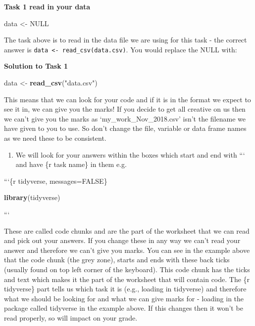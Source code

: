 \documentclass[]{book}
\newenvironment{Shaded}{\begin{snugshade}}{\end{snugshade}}
\newcommand{\KeywordTok}[1]{\textcolor[rgb]{0.13,0.29,0.53}{\textbf{#1}}}
\newcommand{\NormalTok}[1]{#1}
\newcommand{\OtherTok}[1]{\textcolor[rgb]{0.56,0.35,0.01}{#1}}
\newcommand{\StringTok}[1]{\textcolor[rgb]{0.31,0.60,0.02}{#1}}
\providecommand{\tightlist}{%
  \setlength{\itemsep}{0pt}\setlength{\parskip}{0pt}}
\begin{document}
\textbf{Task 1 read in your data}

\begin{Shaded}
\begin{Highlighting}[]
\NormalTok{data <-}\StringTok{ }\OtherTok{NULL}
\end{Highlighting}
\end{Shaded}

The task above is to read in the data file we are using for this task - the correct answer is \texttt{data\ \textless{}-\ read\_csv(data.csv)}. You would replace the NULL with:

\textbf{Solution to Task 1}

\begin{Shaded}
\begin{Highlighting}[]
\NormalTok{data <-}\StringTok{ }\KeywordTok{read_csv}\NormalTok{(}\StringTok{"data.csv"}\NormalTok{)}
\end{Highlighting}
\end{Shaded}

This means that we can look for your code and if it is in the format we expect to see it in, we can give you the marks! If you decide to get all creative on us then we can't give you the marks as `my\_work\_Nov\_2018.csv' isn't the filename we have given to you to use. So don't change the file, variable or data frame names as we need these to be consistent.

\begin{enumerate}
\def\labelenumi{\arabic{enumi}.}
\setcounter{enumi}{1}
\tightlist
\item
  We will look for your answers within the boxes which start and end with ``` and have \{r task name\} in them e.g.
\end{enumerate}

```\{r tidyverse, messages=FALSE\}

\begin{Shaded}
\begin{Highlighting}[]
\KeywordTok{library}\NormalTok{(tidyverse)}
\end{Highlighting}
\end{Shaded}

```

These are called code chunks and are the part of the worksheet that we can read and pick out your answers. If you change these in any way we can't read your answer and therefore we can't give you marks. You can see in the example above that the code chunk (the grey zone), starts and ends with these back ticks (usually found on top left corner of the keyboard). This code chunk has the ticks and text which makes it the part of the worksheet that will contain code. The \{r tidyverse\} part tells us which task it is (e.g., loading in tidyverse) and therefore what we should be looking for and what we can give marks for - loading in the package called tidyverse in the example above. If this changes then it won't be read properly, so will impact on your grade.
\end{document}
